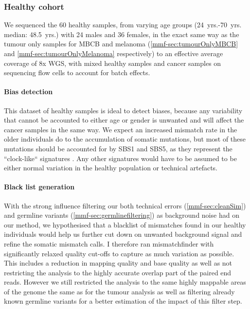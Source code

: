 \subsubsection{Healthy cohort}
\label{mmf-sec:healthy}

We sequenced the 60 healthy samples, from varying age groups (\num{24}~yrs.-\num{70}~yrs. median: \num{48.5}~yrs.) with 24 males and 36 females, in the exact same way as the tumour only samples for MBCB and melanoma (\autoref{mmf-sec:tumourOnlyMBCB} and \autoref{mmf-sec:tumourOnlyMelanoma} respectively) to an effective average coverage of 8x WGS, with mixed healthy samples and cancer samples on sequencing flow cells to account for batch effects.

\paragraph{Bias detection}
\label{mmf-sec:healthyBias}
This dataset of healthy samples is ideal to detect biases, because any variability that cannot be accounted to either age or gender is unwanted and will affect the cancer samples in the same way. We expect an increased mismatch rate in the older individuals do to the accumulation of somatic mutations, but most of these mutations should be accounted for by SBS1 and SBS5, as they represent the ``clock-like`` signatures \cite{Abascal2021}. Any other signatures would have to be assumed to be either normal variation in the healthy population or technical artefacts.



\paragraph{Black list generation}
\label{mmf-sec:healthyBlacklist}
With the strong influence filtering our both technical errors (\autoref{mmf-sec:cleanSim}) and germline variants (\autoref{mmf-sec:germlinefiltering})  as background noise had on our method, we hypothesised that a blacklist of mismatches found in our healthy individuals would help us further cut down on unwanted background signal and refine the somatic mismatch calls. I therefore ran mismatchfinder with significantly relaxed quality cut-offs to capture as much variation as possible. This includes a reduction in mapping quality and base quality as well as not restricting the analysis to the highly accurate overlap part of the paired end reads. However we still restricted the analysis to the same highly mappable areas of the genome the same as for the tumour analysis as well as filtering already known germline variants for a better estimation of the impact of this filter step.

